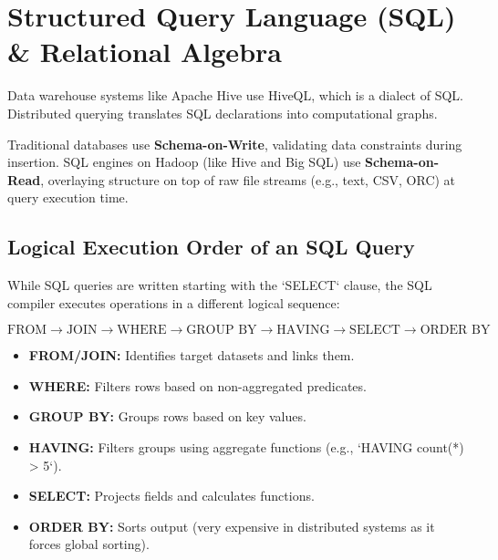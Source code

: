 \documentclass[12pt,a4paper]{article}
\begin{document}
\section{Structured Query Language (SQL) \& Relational Algebra}

Data warehouse systems like Apache Hive use HiveQL, which is a dialect of SQL. Distributed querying translates SQL declarations into computational graphs.

\begin{tcolorbox}[defbox, title={Relational Databases vs. Hadoop Queries}]
  Traditional databases use \textbf{Schema-on-Write}, validating data constraints during insertion. SQL engines on Hadoop (like Hive and Big SQL) use \textbf{Schema-on-Read}, overlaying structure on top of raw file streams (e.g., text, CSV, ORC) at query execution time.
\end{tcolorbox}

\subsection{Logical Execution Order of an SQL Query}
While SQL queries are written starting with the `SELECT` clause, the SQL compiler executes operations in a different logical sequence:

\begin{tcolorbox}[formulabox, title={Logical SQL Execution Order}]
  $$\text{FROM} \longrightarrow \text{JOIN} \longrightarrow \text{WHERE} \longrightarrow \text{GROUP BY} \longrightarrow \text{HAVING} \longrightarrow \text{SELECT} \longrightarrow \text{ORDER BY}$$
  \begin{itemize}[leftmargin=*, noitemsep]
    \item \textbf{FROM/JOIN:} Identifies target datasets and links them.
    \item \textbf{WHERE:} Filters rows based on non-aggregated predicates.
    \item \textbf{GROUP BY:} Groups rows based on key values.
    \item \textbf{HAVING:} Filters groups using aggregate functions (e.g., `HAVING count(*) > 5`).
    \item \textbf{SELECT:} Projects fields and calculates functions.
    \item \textbf{ORDER BY:} Sorts output (very expensive in distributed systems as it forces global sorting).
  \end{itemize}
\end{tcolorbox}
\end{document}
